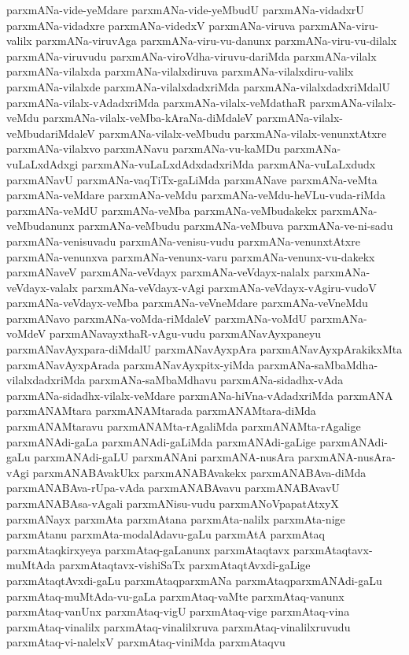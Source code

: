 {parxmANa-vide-yeMdare
parxmANa-vide-yeMbudU
parxmANa-vidadxrU
parxmANa-vidadxre
parxmANa-videdxV
parxmANa-viruva
parxmANa-viru-valilx
parxmANa-viruvAga
parxmANa-viru-vu-danunx
parxmANa-viru-vu-dilalx
parxmANa-viruvudu
parxmANa-viroVdha-viruvu-dariMda
parxmANa-vilalx
parxmANa-vilalxda
parxmANa-vilalxdiruva
parxmANa-vilalxdiru-valilx
parxmANa-vilalxde
parxmANa-vilalxdadxriMda
parxmANa-vilalxdadxriMdalU
parxmANa-vilalx-vAdadxriMda
parxmANa-vilalx-veMdathaR
parxmANa-vilalx-veMdu
parxmANa-vilalx-veMba-kAraNa-diMdaleV
parxmANa-vilalx-veMbudariMdaleV
parxmANa-vilalx-veMbudu
parxmANa-vilalx-venunxtAtxre
parxmANa-vilalxvo
parxmANavu
parxmANa-vu-kaMDu
parxmANa-vuLaLxdAdxgi
parxmANa-vuLaLxdAdxdadxriMda
parxmANa-vuLaLxdudx
parxmANavU
parxmANa-vaqTiTx-gaLiMda
parxmANave
parxmANa-veMta
parxmANa-veMdare
parxmANa-veMdu
parxmANa-veMdu-heVLu-vuda-riMda
parxmANa-veMdU
parxmANa-veMba
parxmANa-veMbudakekx
parxmANa-veMbudanunx
parxmANa-veMbudu
parxmANa-veMbuva
parxmANa-ve-ni-sadu
parxmANa-venisuvadu
parxmANa-venisu-vudu
parxmANa-venunxtAtxre
parxmANa-venunxva
parxmANa-venunx-varu
parxmANa-venunx-vu-dakekx
parxmANaveV
parxmANa-veVdayx
parxmANa-veVdayx-nalalx
parxmANa-veVdayx-valalx
parxmANa-veVdayx-vAgi
parxmANa-veVdayx-vAgiru-vudoV
parxmANa-veVdayx-veMba
parxmANa-veVneMdare
parxmANa-veVneMdu
parxmANavo
parxmANa-voMda-riMdaleV
parxmANa-voMdU
parxmANa-voMdeV
parxmANavayxthaR-vAgu-vudu
parxmANavAyxpaneyu
parxmANavAyxpara-diMdalU
parxmANavAyxpAra
parxmANavAyxpArakikxMta
parxmANavAyxpArada
parxmANavAyxpitx-yiMda
parxmANa-saMbaMdha-vilalxdadxriMda
parxmANa-saMbaMdhavu
parxmANa-sidadhx-vAda
parxmANa-sidadhx-vilalx-veMdare
parxmANa-hiVna-vAdadxriMda
parxmANA
parxmANAMtara
parxmANAMtarada
parxmANAMtara-diMda
parxmANAMtaravu
parxmANAMta-rAgaliMda
parxmANAMta-rAgalige
parxmANAdi-gaLa
parxmANAdi-gaLiMda
parxmANAdi-gaLige
parxmANAdi-gaLu
parxmANAdi-gaLU
parxmANAni
parxmANA-nusAra
parxmANA-nusAra-vAgi
parxmANABAvakUkx
parxmANABAvakekx
parxmANABAva-diMda
parxmANABAva-rUpa-vAda
parxmANABAvavu
parxmANABAvavU
parxmANABAsa-vAgali
parxmANisu-vudu
parxmANoVpapatAtxyX
parxmANayx
parxmAta
parxmAtana
parxmAta-nalilx
parxmAta-nige
parxmAtanu
parxmAta-modalAdavu-gaLu
parxmAtA
parxmAtaq
parxmAtaqkirxyeya
parxmAtaq-gaLanunx
parxmAtaqtavx
parxmAtaqtavx-muMtAda
parxmAtaqtavx-vishiSaTx
parxmAtaqtAvxdi-gaLige
parxmAtaqtAvxdi-gaLu
parxmAtaqparxmANa
parxmAtaqparxmANAdi-gaLu
parxmAtaq-muMtAda-vu-gaLa
parxmAtaq-vaMte
parxmAtaq-vanunx
parxmAtaq-vanUnx
parxmAtaq-vigU
parxmAtaq-vige
parxmAtaq-vina
parxmAtaq-vinalilx
parxmAtaq-vinalilxruva
parxmAtaq-vinalilxruvudu
parxmAtaq-vi-nalelxV
parxmAtaq-viniMda
parxmAtaqvu
}
